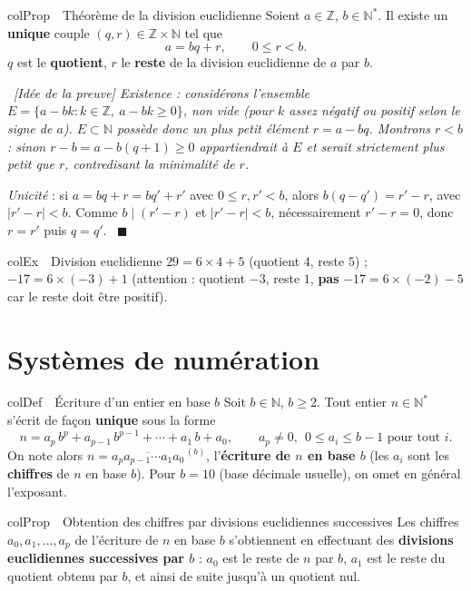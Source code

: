 \documentclass[11pt,a4paper]{article}
\newenvironment{definition}[1][Définition]
  {\begin{fiche}{colDef}{\ding{110}~~#1}}{\end{fiche}}
\newenvironment{propriete}[1][Propriété]
  {\begin{fiche}{colProp}{\ding{72}~~#1}}{\end{fiche}}
\newenvironment{exemple}[1][Exemple]
  {\begin{fiche}{colEx}{\ding{217}~~#1}}{\end{fiche}}
\newenvironment{demo}
  {\par\smallskip\noindent{\sffamily\bfseries\color{qtealdark}Démonstration.}\ \itshape}
  {\ \normalfont\hfill$\blacksquare$\par\medskip}
\begin{document}
\begin{propriete}[Théorème de la division euclidienne]
Soient $a\in\mathbb{Z}$, $b\in\mathbb{N}^*$. Il existe un \textbf{unique} couple $(q,r)\in\mathbb{Z}\times\mathbb{N}$ tel que
\[
  a = bq+r, \qquad 0\leq r<b.
\]
$q$ est le \textbf{quotient}, $r$ le \textbf{reste} de la division euclidienne de $a$ par $b$.
\end{propriete}

\begin{demo}[Idée de la preuve]
\emph{Existence} : considérons l'ensemble $E=\{a-bk : k\in\mathbb{Z},\ a-bk\geq0\}$, non vide (pour $k$ assez négatif ou positif selon le signe de $a$). $E\subset\mathbb{N}$ possède donc un plus petit élément $r=a-bq$. Montrons $r<b$ : sinon $r-b=a-b(q+1)\geq0$ appartiendrait à $E$ et serait strictement plus petit que $r$, contredisant la minimalité de $r$.

\smallskip
\emph{Unicité} : si $a=bq+r=bq'+r'$ avec $0\leq r,r'<b$, alors $b(q-q')=r'-r$, avec $|r'-r|<b$. Comme $b\mid(r'-r)$ et $|r'-r|<b$, nécessairement $r'-r=0$, donc $r=r'$ puis $q=q'$.
\end{demo}

\begin{exemple}[Division euclidienne]
$29=6\times4+5$ (quotient $4$, reste $5$) ; $-17=6\times(-3)+1$ (attention : quotient $-3$, reste $1$, \textbf{pas} $-17=6\times(-2)-5$ car le reste doit être positif).
\end{exemple}

\section{Systèmes de numération}

\begin{definition}[Écriture d'un entier en base $b$]
Soit $b\in\mathbb{N}$, $b\geq2$. Tout entier $n\in\mathbb{N}^*$ s'écrit de façon \textbf{unique} sous la forme
\[
  n = a_p\,b^p + a_{p-1}\,b^{p-1} + \cdots + a_1\,b + a_0, \qquad
  a_p\ne0,\ \ 0\leq a_i\leq b-1 \text{ pour tout } i.
\]
On note alors $n = \overline{a_p a_{p-1}\cdots a_1 a_0}^{\,(b)}$, l'\textbf{écriture de $n$ en base $b$} (les $a_i$ sont les \textbf{chiffres} de $n$ en base $b$). Pour $b=10$ (base décimale usuelle), on omet en général l'exposant.
\end{definition}

\begin{propriete}[Obtention des chiffres par divisions euclidiennes successives]
Les chiffres $a_0,a_1,\ldots,a_p$ de l'écriture de $n$ en base $b$ s'obtiennent en effectuant des \textbf{divisions euclidiennes successives par $b$} : $a_0$ est le reste de $n$ par $b$, $a_1$ est le reste du quotient obtenu par $b$, et ainsi de suite jusqu'à un quotient nul.
\end{propriete}
\end{document}
